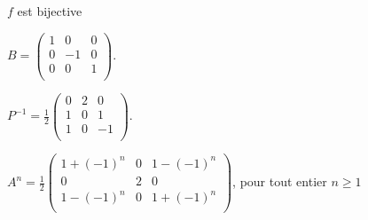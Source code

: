\begin{multi}
    \item* \(f\) est bijective
    \item \(B=\left(\begin{array}{rcc}
1&0&0\\
0&-1&0\\
0&0&1\\
\end{array}\right).\)
    \item* \(P^{-1}= \frac{1}{2}\left(\begin{array}{rcc}
0&2&0\\
1&0&1\\
1&0&-1\\
\end{array}\right).\)
    \item* \(A^n=\frac{1}{2}\left(\begin{array}{rcc}
1+(-1)^n&0&1-(-1)^n\\
0\quad  &2&0\\
1-(-1)^n&0&1+(-1)^n\\
\end{array}\right)\), pour tout entier \(n\ge1\)
\end{multi}


